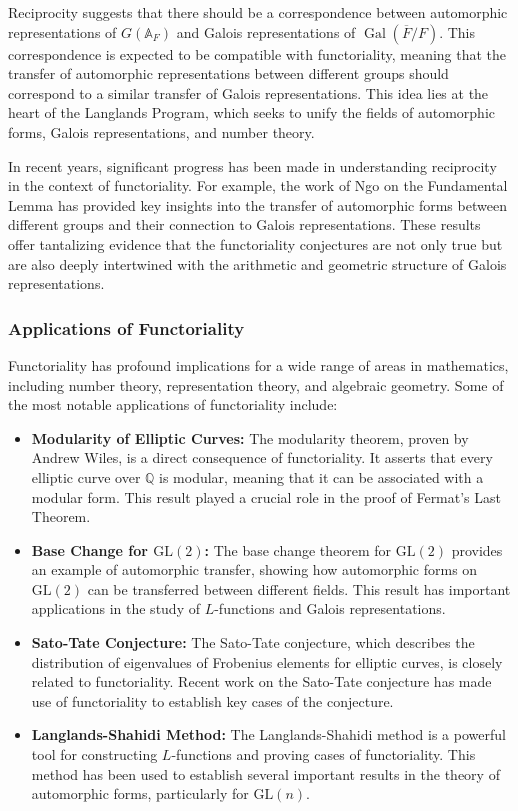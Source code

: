 \documentclass{article}
\theoremstyle{remark}
\begin{document}
Reciprocity suggests that there should be a correspondence between automorphic representations of $G(\mathbb{A}_F)$ and Galois representations of $\operatorname{Gal}(\overline{F}/F)$. This correspondence is expected to be compatible with functoriality, meaning that the transfer of automorphic representations between different groups should correspond to a similar transfer of Galois representations. This idea lies at the heart of the Langlands Program, which seeks to unify the fields of automorphic forms, Galois representations, and number theory.

In recent years, significant progress has been made in understanding reciprocity in the context of functoriality. For example, the work of Ngo on the Fundamental Lemma has provided key insights into the transfer of automorphic forms between different groups and their connection to Galois representations. These results offer tantalizing evidence that the functoriality conjectures are not only true but are also deeply intertwined with the arithmetic and geometric structure of Galois representations.

\subsubsection{Applications of Functoriality}

Functoriality has profound implications for a wide range of areas in mathematics, including number theory, representation theory, and algebraic geometry. Some of the most notable applications of functoriality include:

\begin{itemize}
    \item \textbf{Modularity of Elliptic Curves:} The modularity theorem, proven by Andrew Wiles, is a direct consequence of functoriality. It asserts that every elliptic curve over $\mathbb{Q}$ is modular, meaning that it can be associated with a modular form. This result played a crucial role in the proof of Fermat's Last Theorem.
    
    \item \textbf{Base Change for $\text{GL}(2)$:} The base change theorem for $\text{GL}(2)$ provides an example of automorphic transfer, showing how automorphic forms on $\text{GL}(2)$ can be transferred between different fields. This result has important applications in the study of $L$-functions and Galois representations.
    
    \item \textbf{Sato-Tate Conjecture:} The Sato-Tate conjecture, which describes the distribution of eigenvalues of Frobenius elements for elliptic curves, is closely related to functoriality. Recent work on the Sato-Tate conjecture has made use of functoriality to establish key cases of the conjecture.
    
    \item \textbf{Langlands-Shahidi Method:} The Langlands-Shahidi method is a powerful tool for constructing $L$-functions and proving cases of functoriality. This method has been used to establish several important results in the theory of automorphic forms, particularly for $\text{GL}(n)$.
\end{itemize}
\end{document}
